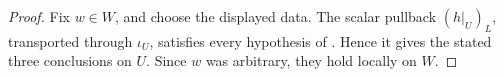 
\begin{proof}
Fix \(w\in W\), and choose the displayed data.  The scalar pullback
\((h|_U)_L\), transported through \(\iota_U\), satisfies every hypothesis of
.  Hence
it gives the stated three conclusions on \(U\).  Since \(w\) was arbitrary,
they hold locally on \(W\).
\end{proof}

